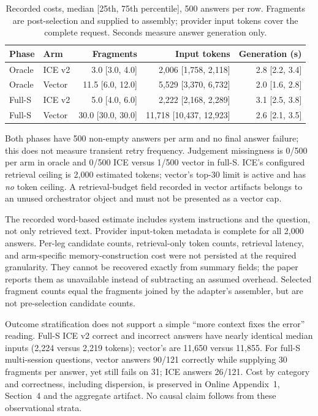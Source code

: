 \documentclass[twoside,11pt]{article}
\begin{document}
\begin{table}[tbp]
\centering\small


\begin{tabular}{@{}llrrr@{}}\toprule
Phase & Arm & Fragments & Input tokens & Generation (s)\\\midrule
Oracle & ICE v2 & 3.0 [3.0, 4.0] & 2,006 [1,758, 2,118] & 2.8 [2.2, 3.4]\\
Oracle & Vector & 11.5 [6.0, 12.0] & 5,529 [3,370, 6,732] & 2.0 [1.6, 2.8]\\
Full-S & ICE v2 & 5.0 [4.0, 6.0] & 2,222 [2,168, 2,289] & 3.1 [2.5, 3.8]\\
Full-S & Vector & 30.0 [30.0, 30.0] & 11,718 [10,437, 12,923] & 2.6 [2.1, 3.5]\\
\bottomrule\end{tabular}
\caption{Recorded costs, median [25th, 75th percentile], 500 answers per row. Fragments are post-selection and supplied to assembly; provider input tokens cover the complete request. Seconds measure answer generation only.}
\label{tab:lme-cost}
\end{table}
Both phases have 500 non-empty answers per arm and no final answer failure; this does not measure transient retry frequency. Judgement missingness is 0/500 per arm in oracle and 0/500 ICE versus 1/500 vector in full-S. ICE's configured retrieval ceiling is 2,000 estimated tokens; vector's top-30 limit is active and has \emph{no} token ceiling. A retrieval-budget field recorded in vector artifacts belongs to an unused orchestrator object and must not be presented as a vector cap.

The recorded word-based estimate includes system instructions and the question, not only retrieved text. Provider input-token metadata is complete for all 2,000 answers. Per-leg candidate counts, retrieval-only token counts, retrieval latency, and arm-specific memory-construction cost were not persisted at the required granularity. They cannot be recovered exactly from summary fields; the paper reports them as unavailable instead of subtracting an assumed overhead. Selected fragment counts equal the fragments joined by the adapter's assembler, but are not pre-selection candidate counts.

Outcome stratification does not support a simple ``more context fixes the error'' reading. Full-S ICE v2 correct and incorrect answers have nearly identical median inputs (2,224 versus 2,219 tokens); vector's are 11,650 versus 11,855. For full-S multi-session questions, vector answers 90/121 correctly while supplying 30 fragments per answer, yet still fails on 31; ICE answers 26/121. Cost by category and correctness, including dispersion, is preserved in Online Appendix~1, Section~4 and the aggregate artifact. No causal claim follows from these observational strata.
\end{document}
